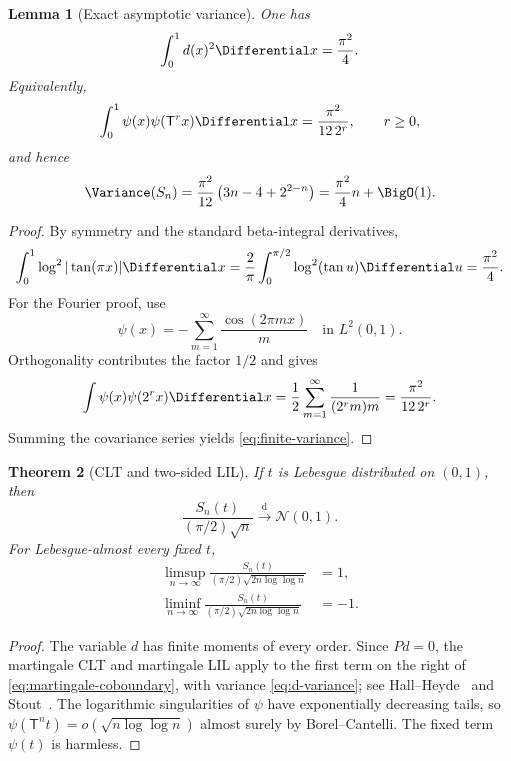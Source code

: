 \documentclass[11pt,oneside]{article}
\newtheorem{theorem}{Theorem}[section]
\newtheorem{lemma}[theorem]{Lemma}
\theoremstyle{definition}
\theoremstyle{remark}
\newcommand{\T}{\mathsf T}
\newcommand{\dist}{\mathop{\longrightarrow}\limits^{\mathrm d}}
\begin{document}
\begin{lemma}[Exact asymptotic variance]
\label{lem:variance}
One has
\begin{equation}
 \int_0^1d(x)^2\Differential x=\frac{\pi^2}{4}.
 \label{eq:d-variance}
\end{equation}
Equivalently,
\begin{equation}
 \int_0^1\psi(x)\psi(\T^rx)\Differential x
 =\frac{\pi^2}{12\,2^r},
 \qquad r\ge0,
 \label{eq:covariance}
\end{equation}
and hence
\begin{equation}
 \Variance(S_n)
 =\frac{\pi^2}{12}\left(3n-4+2^{2-n}\right)
 =\frac{\pi^2}{4}n+\BigO(1).
 \label{eq:finite-variance}
\end{equation}
\end{lemma}

\begin{proof}
By symmetry and the standard beta-integral derivatives,
\[
 \int_0^1\log^2|\tan(\pi x)|\Differential x
 =\frac2\pi\int_0^{\pi/2}\log^2(\tan u)\Differential u
 =\frac{\pi^2}{4}.
\]
For the Fourier proof, use
\begin{equation}
 \psi(x)=-\sum_{m=1}^{\infty}\frac{\cos(2\pi mx)}m
 \quad\text{in }L^2(0,1).
 \label{eq:psi-Fourier}
\end{equation}
Orthogonality contributes the factor $1/2$ and gives
\[
 \int\psi(x)\psi(2^rx)\Differential x
 =\frac12\sum_{m=1}^{\infty}\frac1{(2^rm)m}
 =\frac{\pi^2}{12\,2^r}.
\]
Summing the covariance series yields \eqref{eq:finite-variance}.
\end{proof}

\begin{theorem}[CLT and two-sided LIL]
\label{thm:CLT-LIL}
If $t$ is Lebesgue distributed on $(0,1)$, then
\begin{equation}
 \frac{S_n(t)}{(\pi/2)\sqrt n}\dist\mathcal N(0,1).
 \label{eq:CLT}
\end{equation}
For Lebesgue-almost every fixed $t$,
\begin{align}
 \limsup_{n\to\infty}
 \frac{S_n(t)}{(\pi/2)\sqrt{2n\log\log n}}&=1,
 \label{eq:LIL-plus}\\
 \liminf_{n\to\infty}
 \frac{S_n(t)}{(\pi/2)\sqrt{2n\log\log n}}&=-1.
 \label{eq:LIL-minus}
\end{align}
\end{theorem}

\begin{proof}
The variable $d$ has finite moments of every order.  Since $Pd=0$, the
martingale CLT and martingale LIL apply to the first term on the right of
\eqref{eq:martingale-coboundary}, with variance \eqref{eq:d-variance}; see
Hall--Heyde~\cite{hallheyde} and Stout~\cite{stout}.  The logarithmic
singularities of $\psi$ have exponentially decreasing tails, so
$\psi(\T^nt)=o(\sqrt{n\log\log n})$ almost surely by Borel--Cantelli.  The
fixed term $\psi(t)$ is harmless.
\end{proof}
\end{document}
